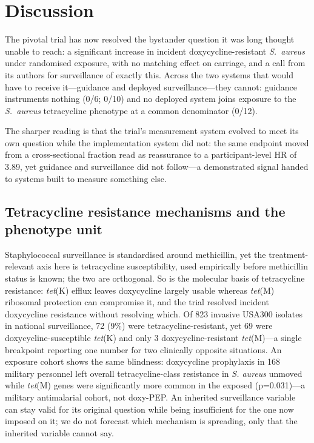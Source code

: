 \documentclass[12pt,a4paper]{article}
\newcommand{\sa}{\emph{S.~aureus}}
\begin{document}
\section*{Discussion}

The pivotal trial has now resolved the bystander question it was long thought
unable to reach: a significant increase in incident doxycycline-resistant \sa{}
under randomised exposure, with no matching effect on carriage, and a call from
its authors for surveillance of exactly this.\cite{luetkemeyer2025} Across the two systems that would have to
receive it---guidance and deployed surveillance---they cannot:
guidance instruments nothing (0/6; 0/10) and no deployed system joins exposure to
the \sa{} tetracycline phenotype at a common denominator (0/12).

The sharper reading is that the trial's measurement system evolved to meet its own
question while the implementation system did not: the same endpoint moved from a
cross-sectional fraction read as reassurance to a participant-level HR of 3.89, yet
guidance and surveillance did not follow\cite{montoya2025estimand}---a demonstrated
signal handed to systems built to measure something else.

\subsection*{Tetracycline resistance mechanisms and the phenotype unit}
Staphylococcal surveillance is standardised around methicillin, yet the
treatment-relevant axis here is tetracycline susceptibility, used empirically
before methicillin status is known; the two are orthogonal. So is the molecular
basis of tetracycline resistance: \emph{tet}(K) efflux leaves doxycycline largely
usable whereas \emph{tet}(M) ribosomal protection can compromise it, and the trial
resolved incident doxycycline resistance without resolving
which.\cite{liu2011,grossman2016} Of 823 invasive
USA300 isolates in national surveillance, 72 (9\%) were tetracycline-resistant,
yet 69 were doxycycline-susceptible \emph{tet}(K) and only 3 doxycycline-resistant
\emph{tet}(M)\cite{mcdougal2010}---a single breakpoint reporting one number for
two clinically opposite situations. An exposure cohort shows the same blindness:
doxycycline prophylaxis in 168 military personnel left overall tetracycline-class
resistance in \emph{S. aureus} unmoved while \emph{tet}(M) genes were significantly
more common in the exposed (p=0.031)\cite{mende2016}---a military antimalarial
cohort, not doxy-PEP. An inherited surveillance variable can stay valid for its
original question while being insufficient for the one now imposed on it; we do
not forecast which mechanism is spreading, only that the inherited variable cannot
say.
\end{document}
